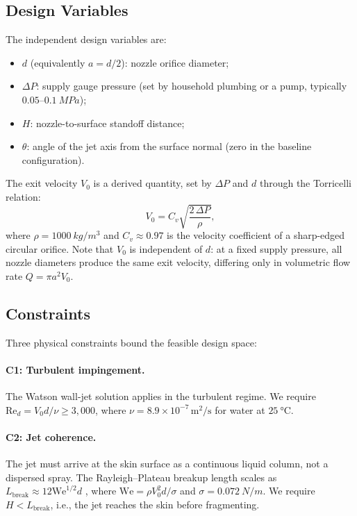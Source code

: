 \documentclass[aps,prfluids,reprint,amsmath,amssymb,floatfix]{revtex4-2}
\newcommand{\Rey}{\mathrm{Re}}
\newcommand{\We}{\mathrm{We}}
\begin{document}
\subsection{Design Variables}
\label{subsec:variables}

The independent design variables are:
\begin{itemize}[leftmargin=*, itemsep=2pt]
  \item $d$ (equivalently $a = d/2$): nozzle orifice diameter;
  \item $\Delta P$: supply gauge pressure (set by household plumbing or a
    pump, typically $0.05$--$\SI{0.1}{MPa}$);
  \item $H$: nozzle-to-surface standoff distance;
  \item $\theta$: angle of the jet axis from the surface normal
    (zero in the baseline configuration).
\end{itemize}
The exit velocity $V_0$ is a derived quantity, set by $\Delta P$ and $d$
through the Torricelli relation:
\begin{equation}
  V_0 = C_v \sqrt{\frac{2\,\Delta P}{\rho}},
  \label{eq:torricelli}
\end{equation}
where $\rho = \SI{1000}{kg/m^3}$ and $C_v \approx 0.97$ is the velocity
coefficient of a sharp-edged circular orifice. Note that $V_0$ is independent
of $d$: at a fixed supply pressure, all nozzle diameters produce the same
exit velocity, differing only in volumetric flow rate $Q = \pi a^2 V_0$.

\subsection{Constraints}
\label{subsec:constraints}

Three physical constraints bound the feasible design space:

\paragraph{C1: Turbulent impingement.}
The Watson wall-jet solution applies in the turbulent regime. We require
$\Rey_d = V_0 d/\nu \geq 3{,}000$, where $\nu = 8.9 \times 10^{-7}\,\mathrm{m^2/s}$
for water at $\SI{25}{\celsius}$.

\paragraph{C2: Jet coherence.}
The jet must arrive at the skin surface as a continuous liquid column, not
a dispersed spray. The Rayleigh--Plateau breakup length scales as
$L_\mathrm{break} \approx 12 \We^{1/2} d$ \citep{Lefebvre1988}, where
$\We = \rho V_0^2 d / \sigma$ and $\sigma = \SI{0.072}{N/m}$.
We require $H < L_\mathrm{break}$, i.e., the jet reaches the skin before
fragmenting.
\end{document}
